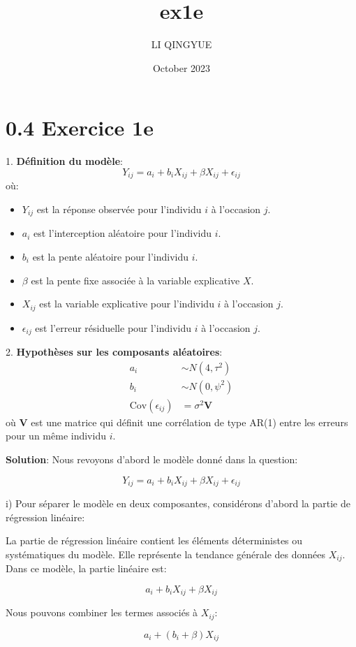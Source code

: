 \documentclass{article}
\title{ex1e}
\author{LI QINGYUE}
\date{October 2023}
\begin{document}
\section*{0.4 Exercice 1e}

1. \textbf{Définition du modèle}:
\[ Y_{ij} = a_i + b_i X_{ij} + \beta X_{ij} + \epsilon_{ij} \]
où:
\begin{itemize}
    \item \( Y_{ij} \) est la réponse observée pour l'individu \( i \) à l'occasion \( j \).
    \item \( a_i \) est l'interception aléatoire pour l'individu \( i \).
    \item \( b_i \) est la pente aléatoire pour l'individu \( i \).
    \item \( \beta \) est la pente fixe associée à la variable explicative \( X \).
    \item \( X_{ij} \) est la variable explicative pour l'individu \( i \) à l'occasion \( j \).
    \item \( \epsilon_{ij} \) est l'erreur résiduelle pour l'individu \( i \) à l'occasion \( j \).
\end{itemize}

2. \textbf{Hypothèses sur les composants aléatoires}:
\begin{align*}
    a_i &\sim N(4, \tau^2) \\
    b_i &\sim N(0, \psi^2) \\
    \text{Cov}(\epsilon_{ij}) &= \sigma^2 \bm{V}
\end{align*}
où \( \bm{V} \) est une matrice qui définit une corrélation de type AR(1) entre les erreurs pour un même individu \( i \).

\textbf{Solution}:
Nous revoyons d'abord le modèle donné dans la question:

\[
Y_{ij} = a_i + b_i X_{ij} + \beta X_{ij} + \epsilon_{ij}
\]

i) Pour séparer le modèle en deux composantes, considérons d'abord la partie de régression linéaire:

La partie de régression linéaire contient les éléments déterministes ou systématiques du modèle. Elle représente la tendance générale des données \(X_{ij}\). Dans ce modèle, la partie linéaire est:

\[
a_i + b_i X_{ij} + \beta X_{ij}
\]

Nous pouvons combiner les termes associés à \(X_{ij}\):

\[
a_i + (b_i + \beta) X_{ij}
\]
\end{document}
